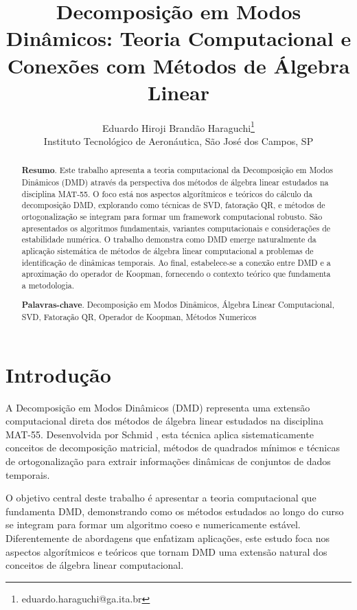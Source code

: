\documentclass[a4,11pt]{pssbmac}
\begin{document}
\title{Decomposição em Modos Dinâmicos: Teoria Computacional e Conexões com Métodos de Álgebra Linear}

\author{
    {\large Eduardo Hiroji Brandão Haraguchi}\thanks{eduardo.haraguchi@ga.ita.br}\\
    {\small Instituto Tecnológico de Aeronáutica, São José dos Campos, SP} \\
}

\criartitulo

\begin{abstract}
{\bf Resumo}. Este trabalho apresenta a teoria computacional da Decomposição em Modos Dinâmicos (DMD) através da perspectiva dos métodos de álgebra linear estudados na disciplina MAT-55. O foco está nos aspectos algorítmicos e teóricos do cálculo da decomposição DMD, explorando como técnicas de SVD, fatoração QR, e métodos de ortogonalização se integram para formar um framework computacional robusto. São apresentados os algoritmos fundamentais, variantes computacionais e considerações de estabilidade numérica. O trabalho demonstra como DMD emerge naturalmente da aplicação sistemática de métodos de álgebra linear computacional a problemas de identificação de dinâmicas temporais. Ao final, estabelece-se a conexão entre DMD e a aproximação do operador de Koopman, fornecendo o contexto teórico que fundamenta a metodologia.

\noindent
{\bf Palavras-chave}. Decomposição em Modos Dinâmicos, Álgebra Linear Computacional, SVD, Fatoração QR, Operador de Koopman, Métodos Numericos
\end{abstract}

\section{Introdução}

A Decomposição em Modos Dinâmicos (DMD) representa uma extensão computacional direta dos métodos de álgebra linear estudados na disciplina MAT-55. Desenvolvida por Schmid \cite{Schmid2010}, esta técnica aplica sistematicamente conceitos de decomposição matricial, métodos de quadrados mínimos e técnicas de ortogonalização para extrair informações dinâmicas de conjuntos de dados temporais.

O objetivo central deste trabalho é apresentar a teoria computacional que fundamenta DMD, demonstrando como os métodos estudados ao longo do curso se integram para formar um algoritmo coeso e numericamente estável. Diferentemente de abordagens que enfatizam aplicações, este estudo foca nos aspectos algorítmicos e teóricos que tornam DMD uma extensão natural dos conceitos de álgebra linear computacional.
\end{document}

